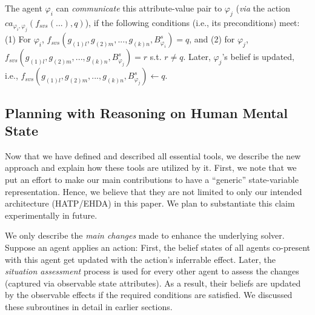 \documentclass[letterpaper]{article} %
\begin{document}
The agent $\varphi_i$ can \textit{communicate} 
this attribute-value pair to $\varphi_j$ (\textit{via} the action $ca_{\varphi_i, \varphi_j}(f_{\textit{svs}}(...),q)$), if the following conditions (i.e., its preconditions) meet: 
(1) For $\varphi_i$, 
$f_{\textit{svs}}(g_{(1)l},g_{(2)m},...,g_{(k)n},B_{\varphi_i}^s) = q$, and (2) for $\varphi_j$,
$f_{\textit{svs}}(g_{(1)l},g_{(2)m},...,g_{(k)n},B_{\varphi_j}^s) = r$ s.t.
$r \neq q$.
Later, $\varphi_j$'s belief is updated, i.e., $f_{\textit{svs}}(g_{(1)l},g_{(2)m},...,g_{(k)n},B_{\varphi_j}^s) \leftarrow q$. 

% 



\subsection{Planning with Reasoning on Human Mental State }
Now that we have defined and described all essential tools, we describe the new approach and explain how these tools are utilized by it. 
First, we note that we put an effort to make our main contributions to have a ``generic'' state-variable representation. Hence, we believe that they are not limited to only our intended architecture (HATP/EHDA) in this paper. We plan to substantiate this claim experimentally in future.

We only describe the \textit{main changes} made to enhance the underlying solver. 
Suppose an agent applies an action: First, the belief states of all agents co-present with this agent get updated with the action's inferrable effect. Later, the \textit{situation assessment} process is used for every other agent to assess the changes (captured via observable state attributes). As a result, their beliefs are updated by the observable effects if the required conditions are satisfied. We discussed these subroutines in detail in earlier sections.
\end{document}
